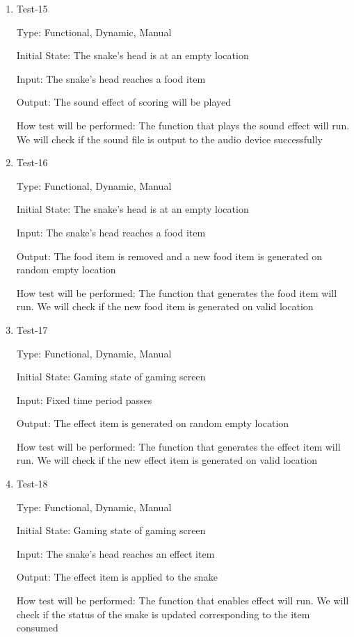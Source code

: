 \documentclass[12pt, titlepage]{article}
\begin{document}
\begin{enumerate}
\item{Test-15\\}

Type: Functional, Dynamic, Manual

Initial State: The snake's head is at an empty location

Input: The snake's head reaches a food item

Output: The sound effect of scoring will be played

How test will be performed: The function that plays the sound effect will run. We will check if the sound file is output to the audio device successfully

\item{Test-16\\}

Type: Functional, Dynamic, Manual

Initial State: The snake's head is at an empty location

Input: The snake's head reaches a food item

Output: The food item is removed and a new food item is generated on random empty location

How test will be performed: The function that generates the food item will run. We will check if the new food item is generated on valid location

\item{Test-17\\}

Type: Functional, Dynamic, Manual

Initial State: Gaming state of gaming screen

Input: Fixed time period passes

Output: The effect item is generated on random empty location

How test will be performed: The function that generates the effect item will run. We will check if the new effect item is generated on valid location

\item{Test-18\\}

Type: Functional, Dynamic, Manual

Initial State: Gaming state of gaming screen

Input: The snake's head reaches an effect item

Output: The effect item is applied to the snake

How test will be performed: The function that enables effect will run. We will check if the status of the snake is updated corresponding to the item consumed


\end{enumerate}
\end{document}
